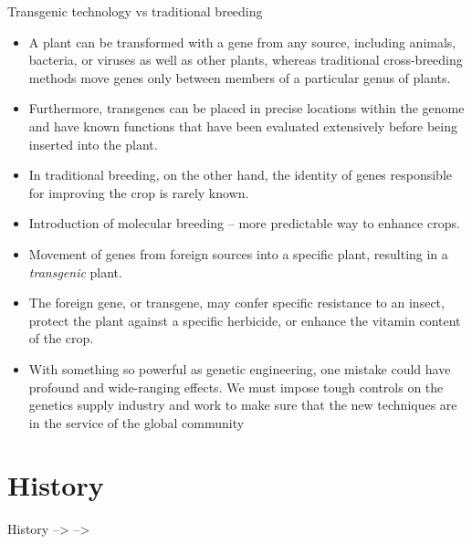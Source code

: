 \documentclass[
  ignorenonframetext,
  aspectratio=169]{beamer}
\providecommand{\tightlist}{%
  \setlength{\itemsep}{0pt}\setlength{\parskip}{0pt}}
\begin{document}
\begin{frame}{Transgenic technology vs traditional breeding}
\protect\hypertarget{transgenic-technology-vs-traditional-breeding}{}
\small

\begin{itemize}
\tightlist
\item
  A plant can be transformed with a gene from any source, including
  animals, bacteria, or viruses as well as other plants, whereas
  traditional cross-breeding methods move genes only between members of
  a particular genus of plants.
\item
  Furthermore, transgenes can be placed in precise locations within the
  genome and have known functions that have been evaluated extensively
  before being inserted into the plant.
\item
  In traditional breeding, on the other hand, the identity of genes
  responsible for improving the crop is rarely known.
\item
  Introduction of molecular breeding -- more predictable way to enhance
  crops.
\item
  Movement of genes from foreign sources into a specific plant,
  resulting in a \emph{transgenic} plant.
\item
  The foreign gene, or transgene, may confer specific resistance to an
  insect, protect the plant against a specific herbicide, or enhance the
  vitamin content of the crop.
\item
  With something so powerful as genetic engineering, one mistake could
  have profound and wide-ranging effects. We must impose tough controls
  on the genetics supply industry and work to make sure that the new
  techniques are in the service of the global community
\end{itemize}
\end{frame}

\hypertarget{history}{%
\section{History}\label{history}}

\begin{frame}{History}
--\textgreater{} --\textgreater{}
\end{frame}
\end{document}
